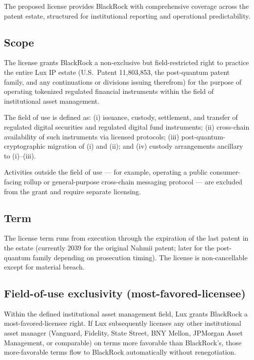 \documentclass[11pt,letterpaper]{article}
\begin{document}
The proposed license provides BlackRock with comprehensive coverage across the patent estate, structured for institutional reporting and operational predictability.

\subsection{Scope}

The license grants BlackRock a non-exclusive but field-restricted right to practice the entire Lux IP estate (U.S.\ Patent 11{,}803{,}853, the post-quantum patent family, and any continuations or divisions issuing therefrom) for the purpose of operating tokenized regulated financial instruments within the field of institutional asset management.

The field of use is defined as: (i) issuance, custody, settlement, and transfer of regulated digital securities and regulated digital fund instruments; (ii) cross-chain availability of such instruments via licensed protocols; (iii) post-quantum-cryptographic migration of (i) and (ii); and (iv) custody arrangements ancillary to (i)--(iii).

Activities outside the field of use --- for example, operating a public consumer-facing rollup or general-purpose cross-chain messaging protocol --- are excluded from the grant and require separate licensing.

\subsection{Term}

The license term runs from execution through the expiration of the last patent in the estate (currently 2039 for the original Nahmii patent; later for the post-quantum family depending on prosecution timing). The license is non-cancellable except for material breach.

\subsection{Field-of-use exclusivity (most-favored-licensee)}

Within the defined institutional asset management field, Lux grants BlackRock a most-favored-licensee right. If Lux subsequently licenses any other institutional asset manager (Vanguard, Fidelity, State Street, BNY Mellon, JPMorgan Asset Management, or comparable) on terms more favorable than BlackRock's, those more-favorable terms flow to BlackRock automatically without renegotiation.
\end{document}
